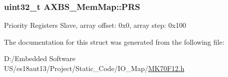 \subsubsection[{P\+R\+S}]{\setlength{\rightskip}{0pt plus 5cm}uint32\+\_\+t A\+X\+B\+S\+\_\+\+Mem\+Map\+::\+P\+R\+S}\label{struct_a_x_b_s___mem_map_a840c4c5791c39bad3cfa7140aaab0a1f}
Priority Registers Slave, array offset\+: 0x0, array step\+: 0x100 

The documentation for this struct was generated from the following file\+:\begin{DoxyCompactItemize}
\item 
D\+:/\+Embedded Software U\+S/es18aut13/\+Project/\+Static\+\_\+\+Code/\+I\+O\+\_\+\+Map/\hyperlink{_m_k70_f12_8h}{M\+K70\+F12.\+h}\end{DoxyCompactItemize}
